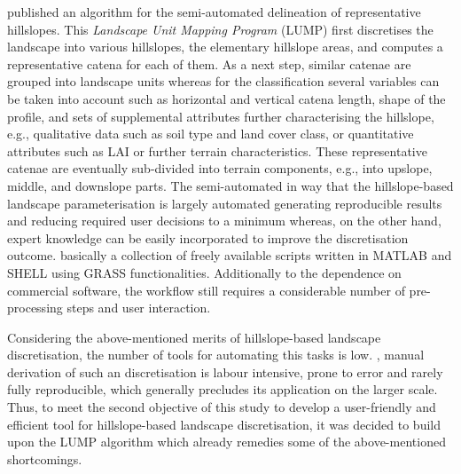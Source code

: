 \citet{Francke2008} published an algorithm for the semi-automated delineation of representative hillslopes.
This \emph{Landscape Unit Mapping Program} (LUMP) first discretises the landscape into various hillslopes, the elementary hillslope areas, and computes a representative catena for each of them.
As a next step, similar catenae are grouped into landscape units whereas for the classification several variables can be taken into account such as horizontal and vertical catena length, shape of the profile, and sets of supplemental attributes further characterising the hillslope, e.g., qualitative data such as soil type and land cover class, or quantitative attributes such as LAI or further terrain characteristics.
These representative catenae are eventually sub-divided into terrain components, e.g., into upslope, middle, and downslope parts.
The \DIFdelbegin {}\DIFdelend \DIFaddbegin {}\DIFaddend semi-automated in way that the hillslope-based landscape parameterisation is largely automated generating reproducible results and reducing required user decisions to a minimum whereas, on the other hand, expert knowledge can be easily incorporated to improve the discretisation outcome.
\DIFdelbegin {}\DIFdelend \DIFaddbegin {}\DIFaddend basically a collection of freely available scripts written in MATLAB and SHELL using GRASS functionalities.
Additionally to the dependence on commercial software, the workflow still requires a considerable number of pre-processing steps and user interaction.
\DIFdelbegin {}\DIFdelend 

Considering the above-mentioned merits of hillslope-based landscape discretisation, the number of tools for automating this tasks is low.
\DIFdelbegin {}\DIFdelend \DIFaddbegin {}\DIFaddend , manual derivation of such an discretisation is labour intensive, prone to error and rarely fully reproducible, which generally precludes its application on the larger scale.
Thus, to meet the second objective of this study to develop a user-friendly and efficient tool for hillslope-based landscape discretisation, it was decided to build upon the LUMP algorithm which already remedies some of the above-mentioned shortcomings.




